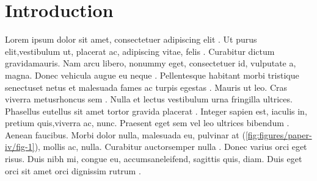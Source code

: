 \chapter[Introduction]{Introduction}

\regularsection
\headerregularsection

\updatemylof %

\begin{sloppypar} %

Lorem  ipsum dolor sit amet, consectetuer adipiscing elit \cite{LIUDIMULYO201767}. Ut purus  elit,vestibulum ut, placerat ac, adipiscing vitae, felis . Curabitur dictum  gravidamauris. Nam arcu libero, nonummy eget, consectetuer id, vulputate a, magna. Donec vehicula augue eu neque \cite{liudimulyo_2018}. Pellentesque habitant morbi tristique senectuset netus et malesuada fames ac turpis egestas . Mauris ut leo. Cras viverra metusrhoncus sem \cite{2019liudimulyo}. Nulla et lectus vestibulum urna fringilla ultrices. Phasellus eutellus sit amet tortor gravida placerat . Integer sapien est, iaculis in, pretium quis,viverra ac, nunc. Praesent eget sem vel leo ultrices bibendum \cite{liudimulyo2020853}. Aenean faucibus. Morbi dolor nulla, malesuada eu, pulvinar at (\ref{fig:figures/paper-iv/fig-1}), mollis ac, nulla. Curabitur auctorsemper nulla . Donec varius orci eget risus. Duis nibh mi, congue eu, accumsaneleifend, sagittis quis, diam. Duis eget orci sit amet orci dignissim rutrum \cite{LIUDIMULYO201767,liudimulyo_2018,2019liudimulyo,liudimulyo2020853,liudimulyo_unpublished1,liudimulyo_unpublished2}.

\end{sloppypar}

